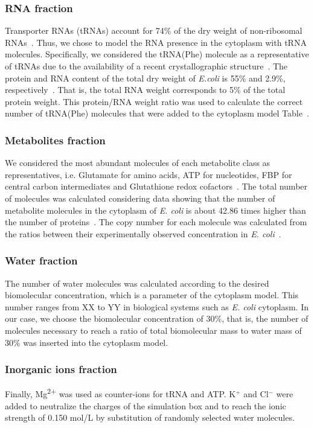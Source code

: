 \documentclass[journal=jacsat,manuscript=article]{achemso}
\newcommand{\tabref}[1]{Table~\plainref{#1}}
\begin{document}
\subsubsection{RNA fraction}
Transporter RNAs (tRNAs) account for 74\% of the dry weight of non-ribosomal RNAs~\cite{phillips2012}. Thus, we chose to model the RNA presence in the cytoplasm with tRNA molecules. Specifically, we considered the tRNA(Phe) molecule as a representative of tRNAs due to the availability of a recent crystallographic structure~\cite{Byrne2015}.
The protein and RNA content of the total dry weight of \textit{E.coli} is 55\% and 2.9\%, respectively~\cite{phillips2012}. That is, the total RNA weight corresponds to 5\% of the total protein weight. This protein/RNA weight ratio was used to calculate the correct number of tRNA(Phe) molecules that were added to the cytoplasm model \tabref{tbl:soup_components}.

\subsubsection{Metabolites fraction}
We considered the most abundant molecules of each metabolite class as representatives, i.e. Glutamate for amino acids, ATP for nucleotides, FBP for central carbon intermediates and Glutathione redox cofactors~\cite{Bennett2009}. The total number of molecules was calculated considering data showing that the number of metabolite molecules in the cytoplasm of \textit{E. coli} is about 42.86 times higher than the number of proteins~\cite{Bennett2009}. The copy number for each molecule was calculated from the ratios between their experimentally observed concentration in {\em E. coli}~\cite{Bennett2009}.

\subsubsection{Water fraction}
The number of water molecules was calculated according to the desired biomolecular concentration, which is a parameter of the cytoplasm model. This number ranges from \colorbox{red!50}{XX to YY} in biological systems such as \textit{E. coli} cytoplasm. In our case, we choose the biomolecular concentration of 30\%, that is, the number of molecules necessary to reach a ratio of total biomolecular mass to water mass of 30\% was inserted into the cytoplasm model.

\subsubsection{Inorganic ions fraction}
Finally, Mg\textsuperscript{2+} was used as counter-ions for tRNA and ATP. K$^{+}$ and Cl$^{-}$ were added to neutralize the charges of the simulation box and to reach the ionic strength of 0.150 mol/L by substitution of randomly selected water molecules.
\end{document}
